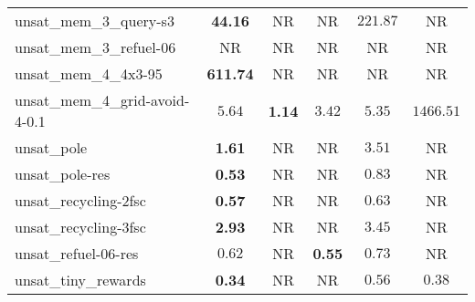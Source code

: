 \begin{tabular}{lccccc}
unsat\_mem\_3\_query-s3 & \textbf{44.16} & NR & NR & $221.87$ & NR \\
unsat\_mem\_3\_refuel-06 & NR & NR & NR & NR & NR \\
unsat\_mem\_4\_4x3-95 & \textbf{611.74} & NR & NR & NR & NR \\
unsat\_mem\_4\_grid-avoid-4-0.1 & $5.64$ & \textbf{1.14} & $3.42$ & $5.35$ & $1466.51$ \\
unsat\_pole & \textbf{1.61} & NR & NR & $3.51$ & NR \\
unsat\_pole-res & \textbf{0.53} & NR & NR & $0.83$ & NR \\
unsat\_recycling-2fsc & \textbf{0.57} & NR & NR & $0.63$ & NR \\
unsat\_recycling-3fsc & \textbf{2.93} & NR & NR & $3.45$ & NR \\
unsat\_refuel-06-res & $0.62$ & NR & \textbf{0.55} & $0.73$ & NR \\
unsat\_tiny\_rewards & \textbf{0.34} & NR & NR & $0.56$ & $0.38$ \\
\bottomrule
\end{tabular}
